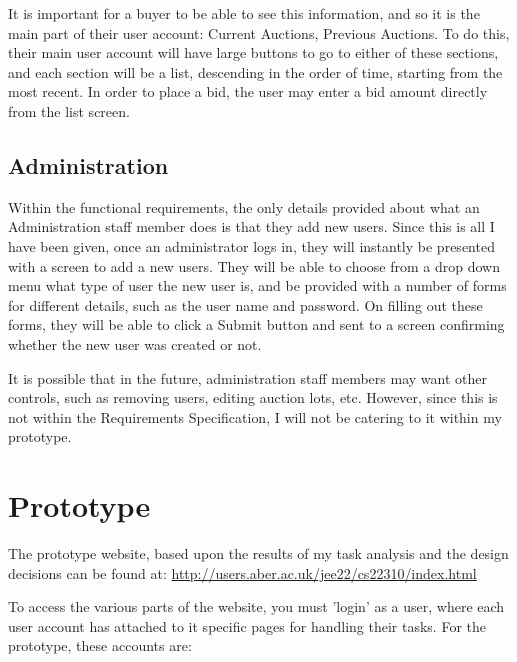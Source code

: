 \documentclass{article}
\begin{document}
It is important for a buyer to be able to see this information, and so it is the main part of their user account: Current Auctions, Previous Auctions. To do this, their main user account will have large buttons to go to either of these sections, and each section will be a list, descending in the order of time, starting from the most recent. In order to place a bid, the user may enter a bid amount directly from the list screen.

\subsection{Administration}

Within the functional requirements, the only details provided about what an Administration staff member does is that they add new users. Since this is all I have been given, once an administrator logs in, they will instantly be presented with a screen to add a new users. They will be able to choose from a drop down menu what type of user the new user is, and be provided with a number of forms for different details, such as the user name and password. On filling out these forms, they will be able to click a Submit button and sent to a screen confirming whether the new user was created or not.

It is possible that in the future, administration staff members may want other controls, such as removing users, editing auction lots, etc. However, since this is not within the Requirements Specification, I will not be catering to it within my prototype.

\clearpage


\section{Prototype}

The prototype website, based upon the results of my task analysis and the design decisions can be found at: 
\url{http://users.aber.ac.uk/jee22/cs22310/index.html}

To access the various parts of the website, you must 'login' as a user, where each user account has attached to it specific pages for handling their tasks. For the prototype, these accounts are:
\end{document}
